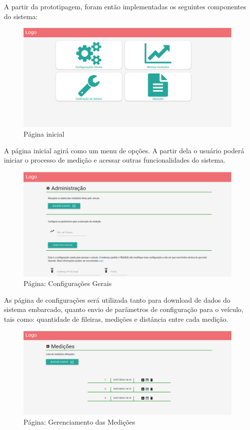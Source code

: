   A partir da prototipagem, foram então implementadas os seguintes componentes
  do sistema:

  \begin{figure}[!htbp]
  \begin{center}
  \includegraphics[width=.6\textwidth]{figuras/index.eps}
  \caption{\label{fig:print_index}Página inicial}
  \end{center}
  \end{figure}
  
  A página inicial agirá como um menu de opções. A partir dela o usuário poderá
  iniciar o processo de medição e acessar outras funcionalidades do sistema.

  \begin{figure}[!htbp]
  \begin{center}
  \includegraphics[width=.6\textwidth]{figuras/config.eps}
  \caption{\label{fig:print_config}Página: Configurações Gerais}
  \end{center}
  \end{figure}

  As página de configurações será utilizada tanto para download de dados do sistema
  embarcado, quanto envio de parâmetros de configuração para o veículo, tais como:
  quantidade de fileiras, medições e distância entre cada medição.

  \begin{figure}[!htbp]
  \begin{center}
  \includegraphics[width=.7\textwidth]{figuras/medicoes.eps}
  \caption{\label{fig:print_medicoes}Página: Gerenciamento das Medições}
  \end{center}
  \end{figure}

